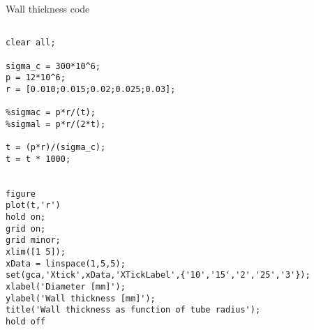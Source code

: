 Wall thickness code

\begin{lstlisting}

clear all;

sigma_c = 300*10^6;
p = 12*10^6;
r = [0.010;0.015;0.02;0.025;0.03];

%sigmac = p*r/(t);
%sigmal = p*r/(2*t);

t = (p*r)/(sigma_c);
t = t * 1000;


figure
plot(t,'r')
hold on;
grid on;
grid minor;
xlim([1 5]);
xData = linspace(1,5,5);
set(gca,'Xtick',xData,'XTickLabel',{'10','15','2','25','3'});
xlabel('Diameter [mm]');
ylabel('Wall thickness [mm]');
title('Wall thickness as function of tube radius');
hold off


\end{lstlisting}

